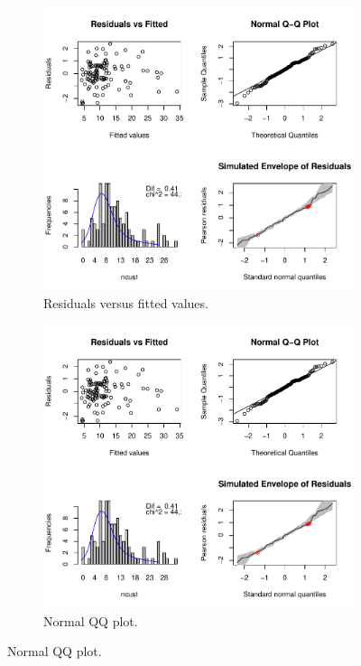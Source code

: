 \begin{figure}
	\centering
	\begin{subfigure}{0.475\textwidth}
		\centering
		\includegraphics[width=\textwidth]{diagnostics_a.pdf}
		\caption{Residuals versus fitted values.}
		\label{fig:diagnostics:a}
	\end{subfigure}
	\hfill
	\begin{subfigure}{0.5\textwidth}
		\centering
		\includegraphics[width=\textwidth]{diagnostics_b.pdf}
		\caption{Normal QQ plot.}
		\label{fig:diagnostics:b}
	\end{subfigure}
	

\end{figure}
